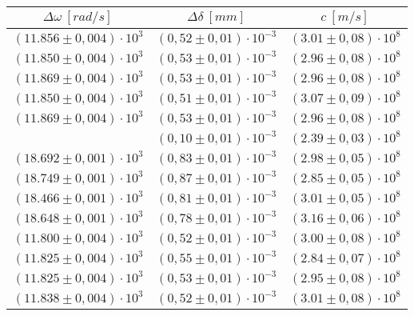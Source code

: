 \begin{table}[H]
    \centering
        \begin{tabular}{|c|c|c|}
        \hline
        $ \Delta\omega~[rad/s] $ & $ \Delta\delta~[mm] $ & $ c~[m/s] $\\
        \hline
        $ (11.856 \pm 0,004) \cdot 10^{3} $ & $ (0,52 \pm 0,01) \cdot 10^{-3} $ & $ (3.01 \pm 0,08) \cdot 10^{8} $\\
        \hline
        $ (11.850 \pm 0,004) \cdot 10^{3} $ & $ (0,53 \pm 0,01) \cdot 10^{-3} $ & $ (2.96 \pm 0,08) \cdot 10^{8} $\\
        \hline
        $ (11.869 \pm 0,004) \cdot 10^{3} $ & $ (0,53 \pm 0,01) \cdot 10^{-3} $ & $ (2.96 \pm 0,08) \cdot 10^{8} $\\
        \hline
        $ (11.850 \pm 0,004) \cdot 10^{3} $ & $ (0,51 \pm 0,01) \cdot 10^{-3} $ & $ (3.07 \pm 0,09) \cdot 10^{8} $\\
        \hline
        $ (11.869 \pm 0,004) \cdot 10^{3} $ & $ (0,53 \pm 0,01) \cdot 10^{-3} $ & $ (2.96 \pm 0,08) \cdot 10^{8} $\\
        \hline
        \textcolor{red}{$ (18.780 \pm 0,001) \cdot 10^{3} $ & $ (0,10 \pm 0,01) \cdot 10^{-3} $ & $ (2.39 \pm 0,03) \cdot 10^{8} $}\\
        \hline
        $ (18.692 \pm 0,001) \cdot 10^{3} $ & $ (0,83 \pm 0,01) \cdot 10^{-3} $ & $ (2.98 \pm 0,05) \cdot 10^{8} $\\
        \hline
        $ (18.749 \pm 0,001) \cdot 10^{3} $ & $ (0,87 \pm 0,01) \cdot 10^{-3} $ & $ (2.85 \pm 0,05) \cdot 10^{8} $\\
        \hline
        $ (18.466 \pm 0,001) \cdot 10^{3} $ & $ (0,81 \pm 0,01) \cdot 10^{-3} $ & $ (3.01 \pm 0,05) \cdot 10^{8} $\\
        \hline
        $ (18.648 \pm 0,001) \cdot 10^{3} $ & $ (0,78 \pm 0,01) \cdot 10^{-3} $ & $ (3.16 \pm 0,06) \cdot 10^{8} $\\
        \hline
        $ (11.800 \pm 0,004) \cdot 10^{3} $ & $ (0,52 \pm 0,01) \cdot 10^{-3} $ & $ (3.00 \pm 0,08) \cdot 10^{8} $\\
        \hline
        $ (11.825 \pm 0,004) \cdot 10^{3} $ & $ (0,55 \pm 0,01) \cdot 10^{-3} $ & $ (2.84 \pm 0,07) \cdot 10^{8} $\\
        \hline
        $ (11.825 \pm 0,004) \cdot 10^{3} $ & $ (0,53 \pm 0,01) \cdot 10^{-3} $ & $ (2.95 \pm 0,08) \cdot 10^{8} $\\
        \hline
        $ (11.838 \pm 0,004) \cdot 10^{3} $ & $ (0,52 \pm 0,01) \cdot 10^{-3} $ & $ (3.01 \pm 0,08) \cdot 10^{8} $\\

\end{tabular}
\end{table}
